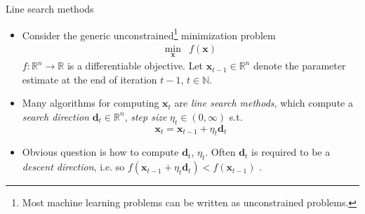 \documentclass{beamer}
\numberwithin{equation}{section}
\begin{document}
\begin{frame}{Line search methods}
    \begin{itemize}
        \item
        Consider the generic unconstrained\footnote{
            Most machine learning problems can be written as unconstrained
            problems.
        } minimization problem
        \begin{equation} \label{eq:unconstrained_min}
            \begin{array}{ll}
                \displaystyle\min_\mathbf{x} & f(\mathbf{x})
            \end{array}
        \end{equation}
        $ f : \mathbb{R}^n \rightarrow \mathbb{R} $ is a differentiable
        objective. Let $ \mathbf{x}_{t - 1} \in \mathbb{R}^n $ denote the
        parameter estimate at the end of iteration $ t - 1 $,
        $ t \in \mathbb{N} $.

        \item
        Many algorithms for computing $ \mathbf{x}_t $ are
        \textit{line search methods}, which compute a \textit{search direction}
        $ \mathbf{d}_t \in \mathbb{R}^n $, \textit{step size}
        $ \eta_t \in (0, \infty) $ s.t. \cite{nocedal_opt}
        \begin{equation} \label{eq:line_search_eq}
            \mathbf{x}_t = \mathbf{x}_{t - 1} + \eta_t\mathbf{d}_t
        \end{equation}

        \item
        Obvious question is how to compute $ \mathbf{d}_t $, $ \eta_t $. Often
        $ \mathbf{d}_t $ is required to be a \textit{descent direction},
        i.e. so $ f(\mathbf{x}_{t - 1} + \eta_t\mathbf{d}_t) <
        f(\mathbf{x}_{t - 1}) $ \cite{nocedal_opt}.
    \end{itemize}

    \medskip
\end{frame}
\end{document}
